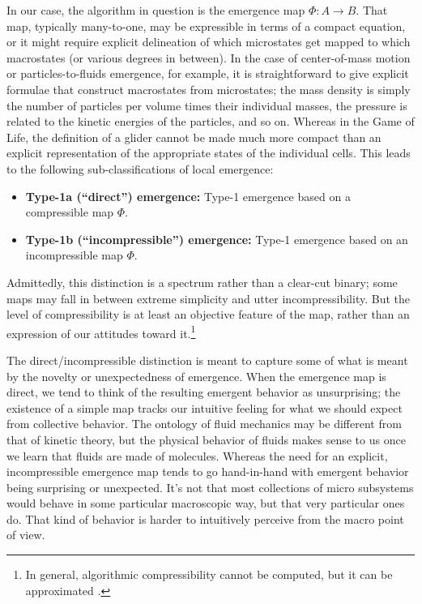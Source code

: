 \documentclass[12pt,english]{article}
\newcommand{\autocite}{\cite}
\begin{document}
In our case, the algorithm in question is the emergence map $\Phi:A \rightarrow B$.
That map, typically many-to-one, may be expressible in terms of a compact equation, or it might require explicit delineation of which microstates get mapped to which macrostates (or various degrees in between).
In the case of center-of-mass motion or particles-to-fluids emergence, for example, it is straightforward to give explicit formulae that construct macrostates from microstates; the mass density is simply the number of particles per volume times their individual masses, the pressure is related to the kinetic energies of the particles, and so on.
Whereas in the Game of Life, the definition of a glider cannot be made much more compact than an explicit representation of the appropriate states of the individual cells.  
This leads to the following sub-classifications of local emergence:
\begin{itemize}
    \item \textbf{Type-1a  (``direct”)  emergence:} Type-1 emergence based on a compressible map $\Phi$.
    \item \textbf{Type-1b (``incompressible”)  emergence:} Type-1 emergence based on an incompressible map $\Phi$.
\end{itemize}
Admittedly, this distinction is a spectrum rather than a clear-cut binary; some maps may fall in between extreme simplicity and utter incompressibility.
But the level of compressibility is at least an objective feature of the map, rather than an expression of our attitudes toward it.\footnote{In general, algorithmic compressibility cannot be computed, but it can be approximated \autocite{jansen2006introduction}.}

The direct/incompressible distinction is meant to capture some of what is meant by the novelty or unexpectedness of emergence.
When the emergence map is direct, we tend to think of the resulting emergent behavior as unsurprising; the existence of a simple map tracks our intuitive feeling for what we should expect from collective behavior.
The ontology of fluid mechanics may be different from that of kinetic theory, but the physical behavior of fluids makes sense to us once we learn that fluids are made of molecules.
Whereas the need for an explicit, incompressible emergence map tends to go hand-in-hand with emergent behavior being surprising or unexpected.
It's not that most collections of micro subsystems would behave in some particular macroscopic way, but that very particular ones do.
That kind of behavior is harder to intuitively perceive from the macro point of view.
\end{document}
